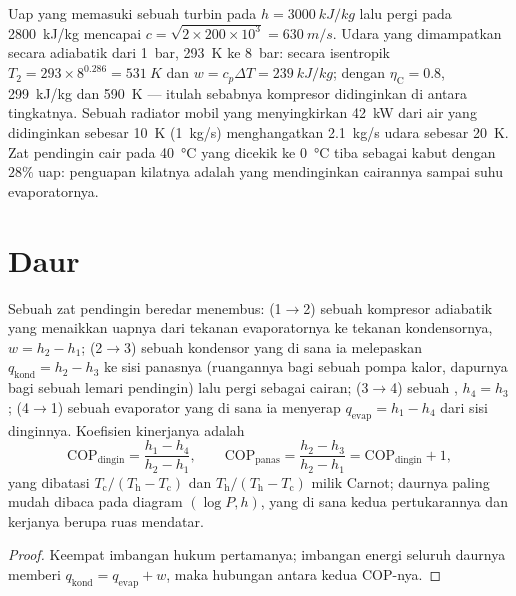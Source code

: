 \begin{example}\label{ex:b2:open-systems:numbers}
Uap yang memasuki sebuah  turbin pada $h = \qty{3000}{kJ/kg}$ lalu pergi
pada \qty{2800}{kJ/kg} mencapai $c = \sqrt{2 \times 200 \times 10^3} =
\qty{630}{m/s}$. Udara yang dimampatkan secara adiabatik dari \qty{1}{bar},
\qty{293}{K} ke \qty{8}{bar}: secara isentropik $T_2 = 293 \times 8^{0.286} =
\qty{531}{K}$ dan $w = c_p\Delta T = \qty{239}{kJ/kg}$; dengan $\eta_{\text{C}} =
0.8$, \qty{299}{kJ/kg} dan \qty{590}{K} --- itulah sebabnya kompresor
didinginkan di antara tingkatnya. Sebuah radiator mobil yang menyingkirkan \qty{42}{kW} dari air
yang didinginkan sebesar \qty{10}{K} (\qty{1}{kg/s}) menghangatkan \qty{2.1}{kg/s} udara sebesar
\qty{20}{K}. Zat pendingin cair pada \qty{40}{\celsius} yang dicekik ke
\qty{0}{\celsius} tiba sebagai kabut dengan $28\%$ uap: penguapan kilatnya
adalah yang mendinginkan cairannya sampai suhu evaporatornya.
\end{example}

\section{Daur}

\begin{proposition}\label{prop:b2:open-systems:fridge}
Sebuah zat pendingin beredar menembus: (1$\to$2) sebuah kompresor adiabatik
yang menaikkan uapnya dari tekanan evaporatornya ke tekanan
kondensornya, $w = h_2 - h_1$; (2$\to$3) sebuah kondensor yang di sana ia melepaskan
$q_{\text{kond}} = h_2 - h_3$ ke sisi panasnya (ruangannya bagi sebuah pompa kalor,
dapurnya bagi sebuah lemari pendingin) lalu pergi sebagai cairan; (3$\to$4) sebuah , $h_4
= h_3$; (4$\to$1) sebuah evaporator yang di sana ia menyerap $q_{\text{evap}} = h_1 - h_4$
dari sisi dinginnya. Koefisien kinerjanya adalah
\[
\mathrm{COP}_{\text{dingin}} = \frac{h_1 - h_4}{h_2 - h_1}, \qquad
\mathrm{COP}_{\text{panas}} = \frac{h_2 - h_3}{h_2 - h_1} = \mathrm{COP}_{\text{dingin}} + 1 ,
\]
yang dibatasi $T_{\text{c}}/(T_{\text{h}} - T_{\text{c}})$ dan
$T_{\text{h}}/(T_{\text{h}} - T_{\text{c}})$ milik Carnot; daurnya paling mudah dibaca pada
diagram $(\log P, h)$, yang di sana kedua pertukarannya dan kerjanya berupa
ruas mendatar.
\end{proposition}

\begin{proof}
Keempat imbangan hukum pertamanya; imbangan energi seluruh daurnya
memberi $q_{\text{kond}} = q_{\text{evap}} + w$, maka hubungan antara
kedua COP-nya.
\end{proof}

